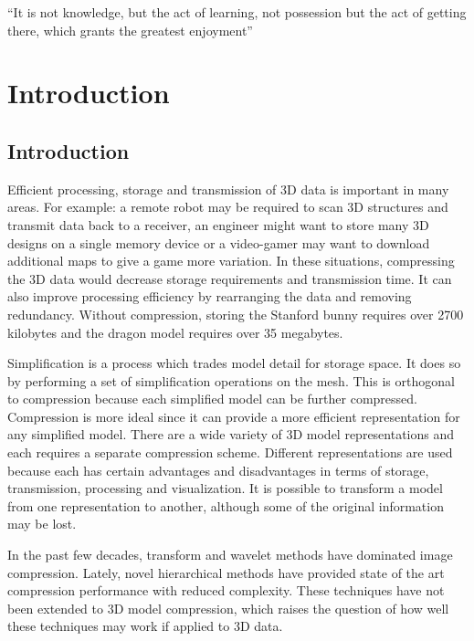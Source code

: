 \begin{savequote}[8cm]
  ``It is not knowledge, but the act of learning, not possession but the act of getting there, which grants the greatest enjoyment''
\end{savequote}
\makeatletter
\chapter{Introduction}

\section{Introduction}

Efficient processing, storage and transmission of 3D data is important in many areas. For example: a remote robot may be required to scan 3D structures and transmit data back to a receiver, an engineer might want to store many 3D designs on a single memory device or a video-gamer may want to download additional maps to give a game more variation. In these situations, compressing the 3D data would decrease storage requirements and transmission time. It can also improve processing efficiency by rearranging the data and removing redundancy. Without compression, storing the Stanford bunny requires over 2700 kilobytes and the dragon model requires over 35 megabytes. 

Simplification is a process which trades model detail for storage space. It does so by performing a set of simplification operations  on the mesh. This is orthogonal to compression because each simplified model can be further compressed. Compression is more ideal since it can provide a more efficient representation for any simplified model. There are a wide variety of 3D model representations and each requires a separate compression scheme. Different representations are used because each has certain advantages and disadvantages in terms of storage, transmission, processing and visualization. It is possible to transform a model from one representation to another, although some of the original information may be lost.

In the past few decades, transform and wavelet methods have dominated image compression. Lately, novel hierarchical methods have provided state of the art compression performance with reduced complexity. These techniques have not been extended to 3D model compression, which raises the question of how well these techniques may work if applied to 3D data. 

